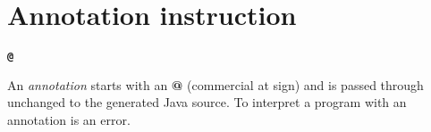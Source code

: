 \chapter{Annotation instruction}\label{refparse}
\begin{shaded}
\begin{alltt}
\textbf{@}
\end{alltt}
\end{shaded}
An \emph{annotation} starts with an \textbf{@} (commercial at sign)
and is passed through unchanged to the generated Java
source. To interpret a program with an annotation is an error.
